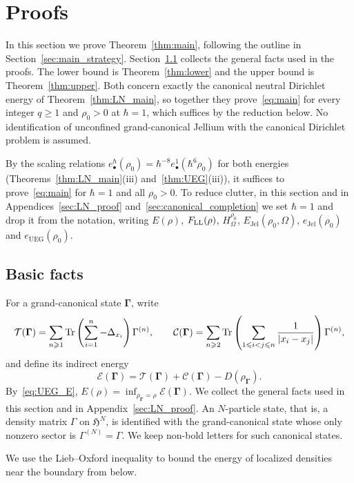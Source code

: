 \documentclass[final,reqno]{amsart}
\theoremstyle{remark}
\theoremstyle{definition}
\renewcommand{\le}{\leqslant}
\renewcommand{\ge}{\geqslant}
\newcommand{\TC}{\mathcal{T}}
\newcommand{\EC}{\mathcal{E}}
\newcommand{\Cc}{\mathcal{C}}
\newcommand{\UEG}{\mathrm{UEG}}
\newcommand{\Jel}{\mathrm{Jel}}
\newcommand{\Hil}{\mathfrak{H}}
\newcommand{\vGamma}{{\bm{\Gamma}}}
\begin{document}
\section{Proofs}\label{sec:proofs}

In this section we prove Theorem~\ref{thm:main}, following the outline in Section~\ref{sec:main_strategy}. Section~\ref{sec:basic} collects the general facts used in the proofs. The lower bound is Theorem~\ref{thm:lower} and the upper bound is Theorem~\ref{thm:upper}. Both concern exactly the canonical neutral Dirichlet energy of Theorem~\ref{thm:LN_main}, so together they prove~\eqref{eq:main} for every integer $q\ge1$ and $\rho_0>0$ at $\hbar=1$, which suffices by the reduction below. No identification of unconfined grand-canonical Jellium with the canonical Dirichlet problem is assumed.

By the scaling relations $e^\hbar_\bullet(\rho_0)=\hbar^{-8}e^1_\bullet(\hbar^6\rho_0)$ for both energies (Theorems~\ref{thm:LN_main}(iii) and~\ref{thm:UEG}(iii)), it suffices to prove~\eqref{eq:main} for $\hbar=1$ and all $\rho_0>0$. To reduce clutter, in this section and in Appendices~\ref{sec:LN_proof} and~\ref{sec:canonical_completion} we set $\hbar=1$ and drop it from the notation, writing $E(\rho)$, $F_{\rm LL}(\rho)$, $H^{\rho_0}_\Omega$, $E_\Jel(\rho_0,\Omega)$, $e_\Jel(\rho_0)$ and $e_\UEG(\rho_0)$.

\subsection{Basic facts}\label{sec:basic}

For a grand-canonical state $\vGamma$, write
\[
\TC(\vGamma)=\sum_{n\ge1}\Tr\left(\sum_{i=1}^n-\Delta_{x_i}\right)\Gamma^{(n)},
\qquad
\Cc(\vGamma)=\sum_{n\ge2}\Tr\left(\sum_{1\le i<j\le n}\frac1{|x_i-x_j|}\right)\Gamma^{(n)},
\]
and define its indirect energy
\[
\EC(\vGamma)=\TC(\vGamma)+\Cc(\vGamma)-D(\rho_{\vGamma}).
\]
By~\eqref{eq:UEG_E}, $E(\rho)=\inf_{\rho_{\vGamma}=\rho}\EC(\vGamma)$. We collect the general facts used in this section and in Appendix~\ref{sec:LN_proof}. An $N$-particle state, that is, a density matrix $\Gamma$ on $\Hil^N$, is identified with the grand-canonical state whose only nonzero sector is $\Gamma^{(N)}=\Gamma$. We keep non-bold letters for such canonical states.

We use the Lieb--Oxford inequality to bound the energy of localized densities near the boundary from below.
\end{document}
